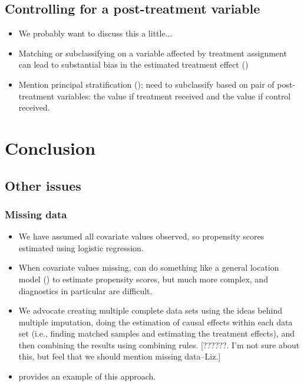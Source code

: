 \documentclass[11pt,titlepage]{article}
\begin{document}
\subsection{Controlling for a post-treatment variable}
\begin{itemize} 
\item We probably want to discuss this a little...
\item Matching or subclassifying on a variable affected by treatment assignment can lead to substantial bias in the estimated treatment effect
(\cite{FraRub02, Greenland03, Imbens04})
\item Mention principal stratification (\cite{FraRub02}); need to subclassify based on pair of post-treatment
variables: the value if treatment received and the value if control received.  
\end{itemize}
                                                                                              
\section{Conclusion}
\subsection{Other issues}
\subsubsection{Missing data}
\begin{itemize} 
\item We have assumed all covariate values observed, so propensity scores estimated using logistic regression.  
\item When covariate values missing, can do something like a general
location model (\cite{DagRub00}) to estimate propensity scores, but much more complex, and diagnostics in particular are difficult.  
\item We advocate creating multiple complete data sets using the ideas behind multiple imputation, 
doing the estimation of causal effects within each data set (i.e., finding matched samples
and estimating the treatment effects), and then combining the results using combining rules. [??????.  I'm not sure about this, but feel that we should mention
missing data--Liz.] 
\item \cite{Song01} provides an example of this approach. 
\end{itemize} 
\end{document}
